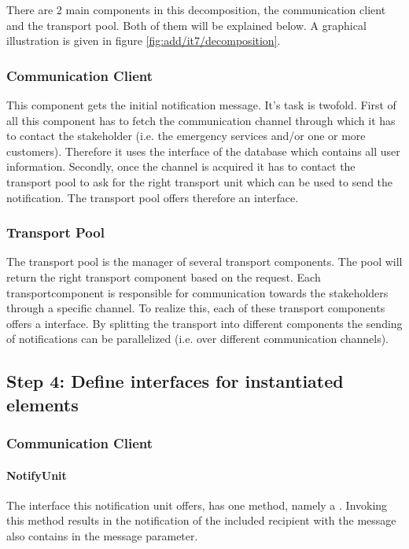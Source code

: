 \npar There are 2 main components in this decomposition, the communication
client and the transport pool. Both of them will be explained below. A graphical
illustration is given in figure \ref{fig:add/it7/decomposition}.

\subsubsection{Communication Client} 
\npar This component gets the initial notification message. It's task is
twofold. First of all this component has to fetch the communication channel
through which it has to contact the stakeholder (i.e. the emergency services
and/or one or more customers). Therefore it uses the 
interface of the database which contains all user information. Secondly, once
the channel is acquired it has to contact the transport pool to ask for the
right transport unit which can be used to send the notification. The transport
pool offers therefore an  interface.

\subsubsection{Transport Pool}

\npar The transport pool is the manager of several transport components. The
pool will return the right transport component based on the request. Each
transportcomponent is responsible for communication towards the stakeholders
through a specific channel. To realize this, each of these transport components
offers a  interface. By splitting the transport into different
components the sending of notifications can be parallelized (i.e. over
different communication channels).

\subsection{Step 4: Define interfaces for instantiated elements}
\label{add:it7/interfaces}

\subsubsection{Communication Client}

\paragraph{NotifyUnit}
\npar The interface this notification unit offers, has one method, namely a
. Invoking this method results in the notification of
the included recipient with the message also contains in the message parameter.

